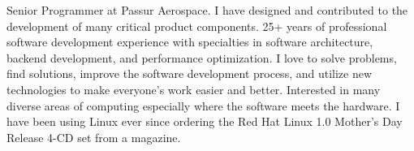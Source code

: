 
\begin{cvparagraph}
Senior Programmer at Passur Aerospace. I have designed and contributed to the development of many critical product components. 25+ years of professional software development experience with specialties in software architecture, backend development, and performance optimization. I love to solve problems, find solutions, improve the software development process, and utilize new technologies to make everyone's work easier and better. Interested in many diverse areas of computing especially where the software meets the hardware. I have been using Linux ever since ordering the Red Hat Linux 1.0 Mother's Day Release 4-CD set from a magazine.
\end{cvparagraph}
